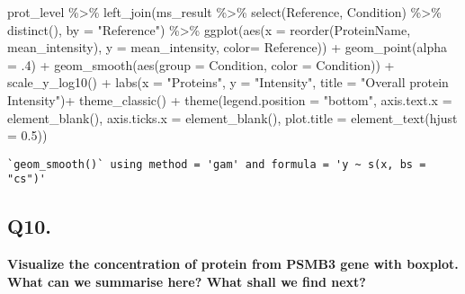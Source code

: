 \documentclass[
  letterpaper,
  DIV=11,
  numbers=noendperiod]{scrartcl}
\newenvironment{Shaded}{\begin{snugshade}}{\end{snugshade}}
\newcommand{\AttributeTok}[1]{\textcolor[rgb]{0.40,0.45,0.13}{#1}}
\newcommand{\DecValTok}[1]{\textcolor[rgb]{0.68,0.00,0.00}{#1}}
\newcommand{\FloatTok}[1]{\textcolor[rgb]{0.68,0.00,0.00}{#1}}
\newcommand{\FunctionTok}[1]{\textcolor[rgb]{0.28,0.35,0.67}{#1}}
\newcommand{\NormalTok}[1]{\textcolor[rgb]{0.00,0.23,0.31}{#1}}
\newcommand{\SpecialCharTok}[1]{\textcolor[rgb]{0.37,0.37,0.37}{#1}}
\newcommand{\StringTok}[1]{\textcolor[rgb]{0.13,0.47,0.30}{#1}}
\begin{document}
\begin{Shaded}
\begin{Highlighting}[]
\NormalTok{prot\_level }\SpecialCharTok{\%\textgreater{}\%} 
   \FunctionTok{left\_join}\NormalTok{(ms\_result }\SpecialCharTok{\%\textgreater{}\%} \FunctionTok{select}\NormalTok{(Reference, Condition) }\SpecialCharTok{\%\textgreater{}\%} \FunctionTok{distinct}\NormalTok{(), }\AttributeTok{by =} \StringTok{"Reference"}\NormalTok{) }\SpecialCharTok{\%\textgreater{}\%}
   \FunctionTok{ggplot}\NormalTok{(}\FunctionTok{aes}\NormalTok{(}\AttributeTok{x =} \FunctionTok{reorder}\NormalTok{(ProteinName, mean\_intensity), }\AttributeTok{y =}\NormalTok{ mean\_intensity, }\AttributeTok{color=}\NormalTok{ Reference)) }\SpecialCharTok{+}
   \FunctionTok{geom\_point}\NormalTok{(}\AttributeTok{alpha =}\NormalTok{ .}\DecValTok{4}\NormalTok{) }\SpecialCharTok{+}  
  \FunctionTok{geom\_smooth}\NormalTok{(}\FunctionTok{aes}\NormalTok{(}\AttributeTok{group =}\NormalTok{ Condition, }\AttributeTok{color =}\NormalTok{ Condition)) }\SpecialCharTok{+}
    \FunctionTok{scale\_y\_log10}\NormalTok{() }\SpecialCharTok{+} 
  \FunctionTok{labs}\NormalTok{(}\AttributeTok{x =} \StringTok{"Proteins"}\NormalTok{, }\AttributeTok{y =} \StringTok{"Intensity"}\NormalTok{,}
  \AttributeTok{title =} \StringTok{"Overall protein Intensity"}\NormalTok{)}\SpecialCharTok{+} 
  \FunctionTok{theme\_classic}\NormalTok{() }\SpecialCharTok{+}
  \FunctionTok{theme}\NormalTok{(}\AttributeTok{legend.position =} \StringTok{"bottom"}\NormalTok{,}
  \AttributeTok{axis.text.x =} \FunctionTok{element\_blank}\NormalTok{(),}
  \AttributeTok{axis.ticks.x =} \FunctionTok{element\_blank}\NormalTok{(),}
  \AttributeTok{plot.title =} \FunctionTok{element\_text}\NormalTok{(}\AttributeTok{hjust =} \FloatTok{0.5}\NormalTok{))}
\end{Highlighting}
\end{Shaded}

\begin{verbatim}
`geom_smooth()` using method = 'gam' and formula = 'y ~ s(x, bs = "cs")'
\end{verbatim}


\subsection{Q10.}\label{q10.}

\textbf{Visualize the concentration of protein from PSMB3 gene with
boxplot. What can we summarise here? What shall we find next?}
\end{document}
